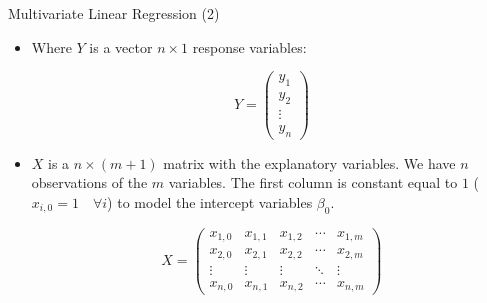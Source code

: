 \documentclass[handout]{beamer}
\begin{document}
\begin{frame}{Multivariate Linear Regression (2)}
\scriptsize{
\begin{itemize} 
\item Where $Y$ is a vector $n\times 1$ response variables:

\begin{displaymath}
 Y =
 \begin{pmatrix}
  y_{1} \\
  y_{2}  \\
  \vdots  \\
  y_{n}
 \end{pmatrix}
\end{displaymath}

\item $X$ is a $n \times (m+1)$  matrix with the explanatory variables. We have $n$ observations of the $m$ variables.  The first column is constant equal to $1$ ($x_{i,0}=1 \quad \forall i$) to model the intercept variables $\beta_0$.

\begin{displaymath}
 X =
 \begin{pmatrix}
x_{1,0} &  x_{1,1} & x_{1,2} & \cdots & x_{1,m} \\
x_{2,0} &  x_{2,1} & x_{2,2} & \cdots & x_{2,m} \\
\vdots  &  \vdots  & \vdots  & \ddots & \vdots  \\
x_{n,0} &  x_{n,1} & x_{n,2} & \cdots & x_{n,m}
 \end{pmatrix}
\end{displaymath}






\end{itemize}
 

}
\end{frame}
\end{document}
